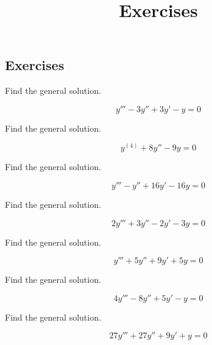 \documentclass{ximera}
\title{Exercises} \license{CC BY-NC-SA 4.0}
\begin{document}
\begin{abstract}
\end{abstract}
\maketitle

\begin{onlineOnly}
\section*{Exercises}
\end{onlineOnly}


\begin{problem}\label{exer:9.2.1}  Find the general solution.

$$y'''-3y''+3y'-y=0$$
\end{problem}

\begin{problem}\label{exer:9.2.2} Find the general solution.

$$y^{(4)}+8y''-9y=0$$

\end{problem}

\begin{problem}\label{exer:9.2.3} Find the general solution.

$$y'''-y''+16y'-16y=0$$

\end{problem}


\begin{problem}\label{exer:9.2.4} Find the general solution.

$$2y'''+3y''-2y'-3y=0$$
\end{problem}

\begin{problem}\label{exer:9.2.5} Find the general solution.

$$y'''+5y''+9y'+5y=0$$

\end{problem}


\begin{problem}\label{exer:9.2.6}  Find the general solution.

$$4y'''-8y''+5y'-y=0$$

\end{problem}

\begin{problem}\label{exer:9.2.7} Find the general solution.

$$27y'''+27y''+9y'+y=0$$

\end{problem}
\end{document}
